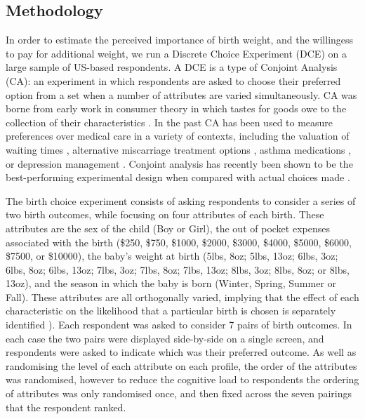 \documentclass[a4paper, 11pt]{article}
\begin{document}
\begin{spacing}{1.4}
\section{Methodology}
\label{scn:methods}
In order to estimate the perceived importance of birth weight, and the willingess
to pay for additional weight, we run a Discrete Choice Experiment (DCE) on a
large sample of US-based respondents. A DCE is a type of Conjoint Analysis (CA):
an experiment in which respondents are asked to choose their preferred option
from a set when a number of attributes are varied simultaneously.
CA was borne from early work in consumer theory in which tastes for goods owe
to the collection of their characteristics \citep{Lancaster1966}.  In the
past CA has been used to measure preferences over medical care in a variety of
contexts, including the valuation of waiting times \citep{Propper1990,Propper1995},
alternative miscarriage treatment options \citep{RyanHughes1997}, asthma
medications \citep{Kingetal2007}, or depression management \citep{Wittinketal2010}.
Conjoint analysis has recently been shown to be the best-performing experimental
design when compared with actual choices made \citep{Hainmuelleretal2015}.

The birth choice experiment consists of asking respondents to consider a series
of two birth outcomes, while focusing on four attributes of each birth.  These
attributes are the sex of the child (Boy or Girl), the out of pocket expenses
associated with the birth (\$250, \$750, \$1000, \$2000, \$3000, \$4000, \$5000,
\$6000, \$7500, or \$10000), the baby's weight at birth (5lbs, 8oz; 5lbs, 13oz;
6lbs, 3oz; 6lbs, 8oz; 6lbs, 13oz; 7lbs, 3oz; 7lbs, 8oz; 7lbs, 13oz; 8lbs, 3oz;
8lbs, 8oz; or 8lbs, 13oz), and the season in which the baby is born (Winter,
Spring, Summer or Fall).  These attributes are all orthogonally varied, implying
that the effect of each characteristic on the likelihood that a particular birth
is chosen is separately identified \citep{Marshalletal2010}). Each respondent 
was asked to consider 7 pairs of birth outcomes.  In each case the two pairs
were displayed side-by-side on a single screen, and respondents were asked to
indicate which was their preferred outcome.  As well as randomising the level
of each attribute on each profile, the order of the attributes was randomised,
however to reduce the cognitive load to respondents the ordering of attributes
was only randomised once, and then fixed across the seven pairings that the
respondent ranked.


\end{spacing}
\end{document}
